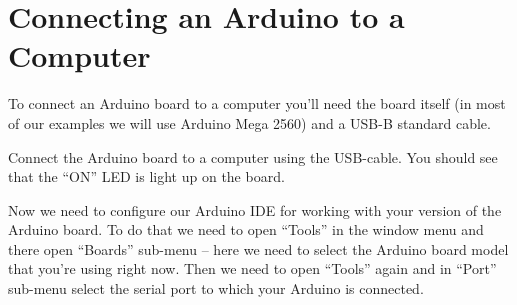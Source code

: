 \documentclass[../sparc.tex]{subfiles}
\begin{document}
\section{Connecting an Arduino to a Computer}
To connect an Arduino board to a computer you'll need the board itself (in most
of our examples we will use Arduino Mega 2560) and a USB-B standard cable.

Connect the Arduino board to a computer using the USB-cable.  You should see
that the ``ON'' LED is light up on the board.

Now we need to configure our Arduino \gls{IDE} for working with your version of
the Arduino board.  To do that we need to open ``Tools'' in the window menu and
there open ``Boards'' sub-menu -- here we need to select the Arduino board model
that you're using right now.  Then we need to open ``Tools'' again and in
``Port'' sub-menu select the serial port to which your Arduino is connected.
\end{document}
